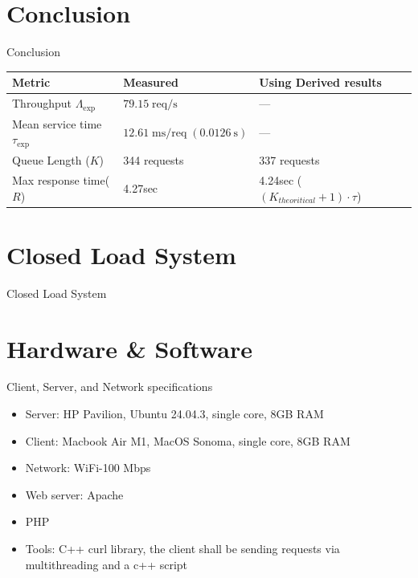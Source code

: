 \documentclass[10pt]{beamer}
\begin{document}
\section{Conclusion}
\begin{frame}{Conclusion}
  \vspace{1ex}
  \begin{tabular}{l l l l}
    \toprule
    \textbf{Metric} & \textbf{Measured} & \textbf{Using Derived results} \\
    \midrule
    Throughput $\Lambda_{\text{exp}}$ & $79.15\;\mathrm{req/s}$ & ---  \\
    Mean service time $\tau_{\text{exp}}$ & $12.61\;\mathrm{ms/req}\;(0.0126\ \mathrm{s})$ & --- \\
    Queue Length ($K$) & 344 requests & 337 requests
    \\
    Max response time($R$) & 4.27sec & 4.24sec ($(K_{theoritical}+1)\cdot\tau$)
  \end{tabular}
\end{frame}


\section{Closed Load System}
\begin{frame}{} 
    \begin{center}
        \Huge Closed Load System
    \end{center}    
\end{frame}

\section{Hardware \& Software}
\begin{frame}{Client, Server, and Network specifications}
  \begin{itemize}
    \item Server: HP Pavilion, Ubuntu 24.04.3, single core, 8GB RAM  
    \item Client: Macbook Air M1, MacOS Sonoma, single core, 8GB RAM
    \item Network: WiFi-100 Mbps
    \item Web server: Apache
    \item PHP
    \item Tools: C++ curl library, the client shall be sending requests via multithreading and a c++ script
  \end{itemize}
\end{frame}
\end{document}
